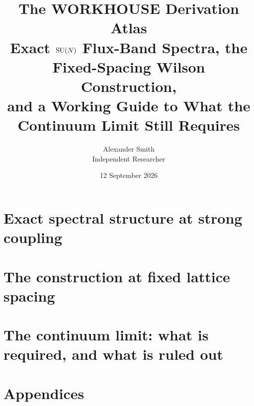 \documentclass[11pt,letterpaper]{article}
\title{\bfseries The WORKHOUSE Derivation Atlas\\[4pt]
\large Exact \texorpdfstring{$\mathrm{SU}(N)$}{SU(N)} Flux-Band Spectra, the
Fixed-Spacing Wilson Construction,\\ and a Working Guide to What the
Continuum Limit Still Requires}
\author{Alexander Smith\\\small Independent Researcher}
\date{12 September 2026}
\begin{document}
\maketitle



\tableofcontents
\bigskip






\part{Exact spectral structure at strong coupling}\label{part:exact}










\part{The construction at fixed lattice spacing}\label{part:fixed}


\part{The continuum limit: what is required, and what is ruled out}\label{part:continuum}






\appendix
\part*{Appendices}













\end{document}
